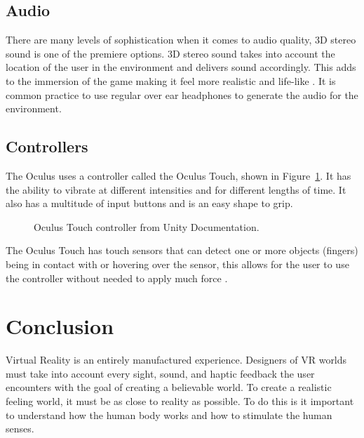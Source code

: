 

\subsection{Audio}
There are many levels of sophistication when it comes to audio quality, 3D stereo sound is one of the premiere options. 3D stereo sound takes into account the location of the user in the environment and delivers sound accordingly. This adds to the immersion of the game making it feel more realistic and life-like \cite{JIS3}. It is common practice to use regular over ear headphones to generate the audio for the environment. 


\subsection{Controllers}
The Oculus uses a controller called the Oculus Touch, shown in Figure~\ref{fig:controller}. It has the ability to vibrate at different intensities and for different lengths of time. It also has a multitude of input buttons and is an easy shape to grip. 
\begin{figure}[!ht]
	\begin{center}
	\end{center}
	\caption{Oculus Touch controller from Unity Documentation.} \label{fig:controller}
\end{figure} The Oculus Touch has touch sensors that can detect one or more objects (fingers) being in contact with or hovering over the sensor, this allows for the user to use the controller without needed to apply much force \cite{Publications2018}. 


\section{Conclusion}
Virtual Reality is an entirely manufactured experience. Designers of VR worlds must take into account every sight, sound, and haptic feedback the user encounters with the goal of creating a believable world. To create a realistic feeling world, it must be as close to reality as possible. To do this is it important to understand how the human body works and how to stimulate the human senses. 



